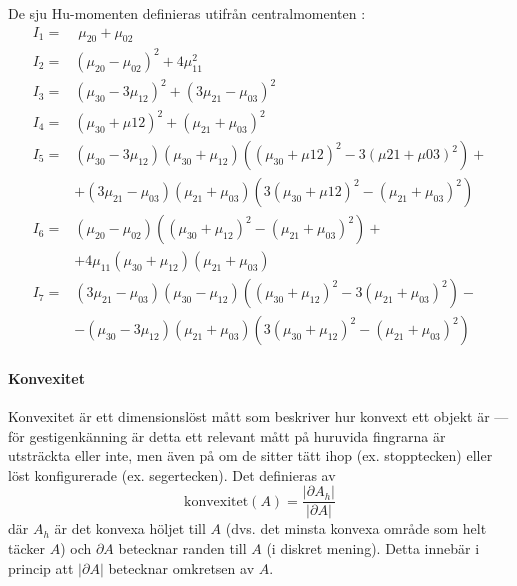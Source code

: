 \documentclass[../rapport_MVEX01-11-05]{subfiles}
\begin{document}
De sju Hu-momenten definieras utifrån centralmomenten \cite[s.~185]{Hu62}:
\begin{align*}
	I_1 =& \;\mu_{20} + \mu_{02}\\
	I_2 =& \left(\mu_{20} - \mu_{02}\right)^2 + 4\mu^2_{11}\\
	I_3 =& \left(\mu_{30} - 3\mu_{12}\right)^2 +
	       \left(3\mu_{21} - \mu_{03}\right)^2\\
	I_4 =& \left(\mu_{30} + \mu{12}\right)^2 +
 	       \left(\mu_{21} + \mu_{03}\right)^2\\
	I_5 =& \left(\mu_{30} - 3\mu_{12}\right)
	       \left(\mu_{30} + \mu_{12}\right)
	       \left(\left(\mu_{30}+\mu{12}\right)^2 -
	       3\left(\mu{21}+\mu{03}\right)^2\right) + \\
 	    &+ \left(3\mu_{21} - \mu_{03}\right)\left(\mu_{21} + \mu_{03}\right)
	       \left(3\left(\mu_{30} + \mu{12}\right)^2 -
	       \left(\mu_{21} + \mu_{03}\right)^2\right)\\
	I_6 =& \left(\mu_{20}-\mu_{02}\right)
	       \left(\left(\mu_{30}+\mu_{12}\right)^2 -
	       \left(\mu_{21}+\mu_{03}\right)^2\right) + \\
	    &+ 4\mu_{11}\left(\mu_{30}+\mu_{12}\right)
	       \left(\mu_{21}+\mu_{03}\right)\\
	I_7 =& \left(3\mu_{21}-\mu_{03}\right)\left(\mu_{30}-\mu_{12}\right)
	       \left(\left(\mu_{30}+\mu_{12}\right)^2 - 
	       3\left(\mu_{21}+\mu_{03}\right)^2\right) - \\
	    &- \left(\mu_{30} - 3\mu_{12}\right)\left(\mu_{21}+\mu_{03}\right)
	       \left(3\left(\mu_{30}+\mu_{12}\right)^2 - 
  	     \left(\mu_{21}+\mu_{03}\right)^2\right)
\end{align*}



\paragraph{Konvexitet}

Konvexitet \cite[s.~26]{Rudemo09} är ett dimensionslöst
mått som beskriver hur konvext ett objekt är --- för
gestigenkänning är detta ett relevant mått på huruvida fingrarna är
utsträckta eller inte, men även på om de sitter tätt ihop (ex.
stopptecken) eller löst konfigurerade (ex. segertecken). Det
definieras av
\begin{equation*}
  \textrm{konvexitet}(A) = \frac{\left|\partial A_h\right|}{\left|\partial A\right|}
\end{equation*}
där $A_h$ är det konvexa höljet till $A$ (dvs. det minsta konvexa område som
helt täcker $A$) och $\partial A$ betecknar randen till $A$ (i diskret
mening). Detta innebär i princip att $\left|\partial A\right|$
betecknar omkretsen av $A$.
\end{document}
